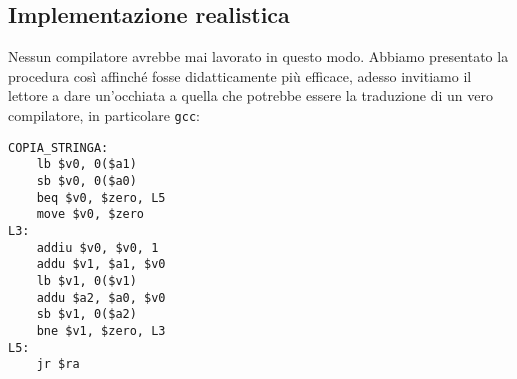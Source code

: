 \subsection{Implementazione realistica}
Nessun compilatore avrebbe mai lavorato in questo modo. Abbiamo presentato la procedura così affinché fosse didatticamente più efficace, adesso invitiamo il lettore a dare un'occhiata a quella che potrebbe essere la traduzione di un vero compilatore, in particolare \texttt{gcc}:
\begin{verbatim}
COPIA_STRINGA:
	lb $v0, 0($a1)
	sb $v0, 0($a0)
	beq $v0, $zero, L5
	move $v0, $zero
L3:
	addiu $v0, $v0, 1
	addu $v1, $a1, $v0
	lb $v1, 0($v1)
	addu $a2, $a0, $v0
	sb $v1, 0($a2)
	bne $v1, $zero, L3
L5:
	jr $ra
\end{verbatim}


